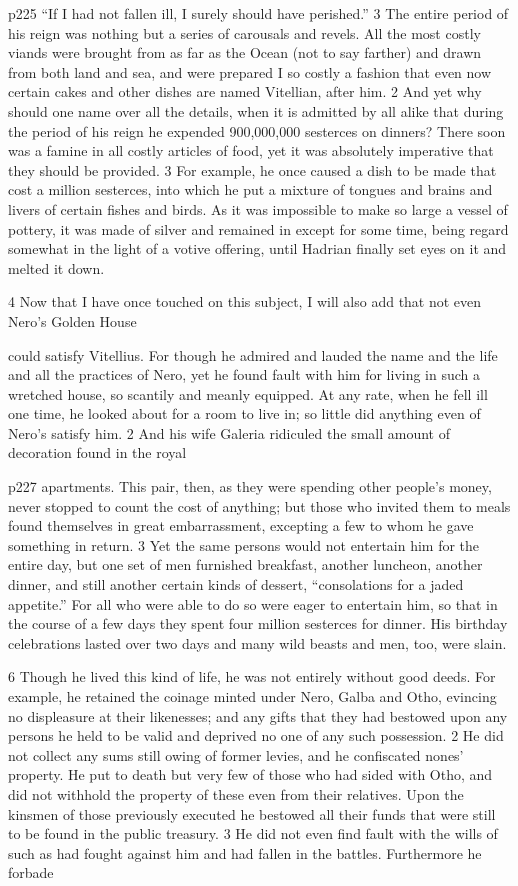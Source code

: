 p225 ``If I had not fallen ill, I surely should have perished.'' 3 The entire period of his reign was nothing but a series of carousals and revels. All the most costly viands were brought from as far as the Ocean (not to say farther) and drawn from both land and sea, and were prepared I so costly a fashion that even now certain cakes and other dishes are named Vitellian, after him. 2 And yet why should one name over all the details, when it is admitted by all alike that during the period of his reign he expended 900,000,000 sesterces on dinners? There soon was a famine in all costly articles of food, yet it was absolutely imperative that they should be provided. 3 For example, he once caused a dish to be made that cost a million sesterces, into which he put a mixture of tongues and brains and livers of certain fishes and birds. As it was impossible to make so large a vessel of pottery, it was made of silver and remained in except for some time, being regard somewhat in the light of a votive offering, until Hadrian finally set eyes on it and melted it down.

4
Now that I have once touched on this subject, I will also add that not even Nero's
Golden House

could satisfy Vitellius. For though he admired and lauded the name and the life and all the practices of Nero, yet he found fault with him for living in such a wretched house, so scantily and meanly equipped. At any rate, when he fell ill one time, he looked about for a room to live in; so little did anything even of Nero's satisfy him. 2 And his wife Galeria ridiculed the small amount of decoration found in the royal

p227 apartments. This pair, then, as they were spending other people's money, never stopped to count the cost of anything; but those who invited them to meals found themselves in great embarrassment, excepting a few to whom he gave something in return. 3 Yet the same persons would not entertain him for the entire day, but one set of men furnished breakfast, another luncheon, another dinner, and still another certain kinds of dessert, ``consolations for a jaded appetite.'' For all who were able to do so were eager to entertain him, so that in the course of a few days they spent four million sesterces for dinner. His birthday celebrations lasted over two days and many wild beasts and men, too, were slain.

6
Though he lived this kind of life, he was not entirely without good deeds. For example, he retained the coinage minted under Nero, Galba and Otho, evincing no displeasure at their likenesses; and any gifts that they had bestowed upon any persons he held to be valid and deprived no one of any such possession. 2 He did not collect any sums still owing of former levies, and he confiscated nones' property. He put to death but very few of those who had sided with Otho, and did not withhold the property of these even from their relatives. Upon the kinsmen of those previously executed he bestowed all their funds that were still to be found in the public treasury. 3 He did not even find fault with the wills of such as had fought against him and had fallen in the battles. Furthermore he forbade

